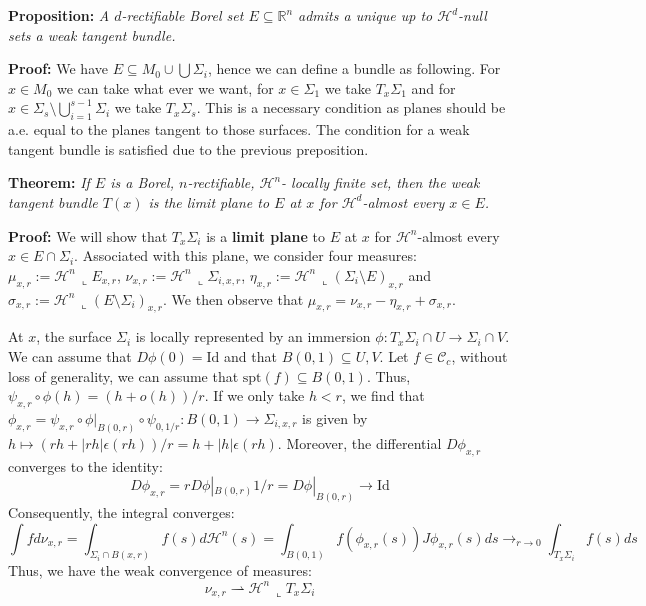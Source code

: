 \documentclass{article}
\begin{document}
\vspace{2ex}
\textbf{Proposition:} \textit{A $d$-rectifiable Borel set $E\subseteq\mathbb R^n$
admits a unique up to $\mathcal H^d$-null sets a weak tangent bundle.}

\vspace{1ex}
\textbf{Proof:} We have $E\subseteq M_0\cup\bigcup\Sigma_i$, hence we can define
a bundle as following. For $x\in M_0$ we can take what ever we want, for $x\in
\Sigma_1$ we take $T_x\Sigma_1$ and for $x\in \Sigma_s\setminus\bigcup_{i=1}^{s
-1}\Sigma_i$ we take $T_x\Sigma_s$. This is a necessary condition as planes
should be a.e. equal to the planes tangent to those surfaces. The condition for
a weak tangent bundle is satisfied due to the previous preposition.

\vspace{2ex}
\textbf{Theorem:} \textit{If $E$ is a Borel, $n$-rectifiable, $\mathcal{H}^n$-
locally finite set, then the weak tangent bundle $T(x)$ is the limit plane to
$E$ at $x$ for $\mathcal{H}^d$-almost every $x\in E$.}

\vspace{1ex}
\textbf{Proof:}
We will show that $T_x\Sigma_i$ is a \textbf{limit plane} to $E$ at $x$ for
$\mathcal H^n$-almost every $x\in E\cap\Sigma_i$. Associated with this plane,
we consider four measures: $\mu_{x,r}:=\mathcal H^n\,\llcorner E_{x,r}$,
$\nu_{x,r}:=\mathcal H^n\,\llcorner\Sigma_{i,x,r}$, $\eta_{x,r}:=\mathcal H^n\,
\llcorner (\Sigma_i\setminus E)_{x,r}$ and $\sigma_{x,r}:=\mathcal H^n\,
\llcorner (E\setminus\Sigma_i)_{x,r}$. We then observe that $\mu_{x,r}=\nu_{x,r}
-\eta_{x,r}+\sigma_{x,r}$.

\vspace{1ex}
At $x$, the surface $\Sigma_i$ is locally represented by an immersion $\phi: T_x\Sigma_i \cap U \rightarrow \Sigma_i \cap V$. We can assume that $D\phi(0)=\text{Id}$ and that $B(0,1)\subseteq U,V$. Let $f\in\mathcal C_c$, without loss of generality, we can assume that $\text{spt}(f)\subseteq B(0,1)$. Thus, $\psi_{x,r}\circ \phi(h)=(h+o(h))/r$. If we only take $h<r$, we find that $\phi_{x,r}=\psi_{x,r}\circ \phi|_{B(0,r)}\circ \psi_{0,1/r}:B(0,1) \rightarrow \Sigma_{i,x,r}$ is given by $h\mapsto (rh+|rh|\epsilon(rh))/r=h+|h|\epsilon(rh)$.
Moreover, the differential $D\phi_{x,r}$ converges to the identity:
\[D\phi_{x,r}=rD\phi|_{B(0,r)}1/r=D\phi|_{B(0,r)}\rightarrow \text{Id}\]
Consequently, the integral converges:
\[\int fd\nu_{x,r}=\int_{\Sigma_i\cap B(x,r)}f(s)d\mathcal H^n(s)=\int_{B(0,1)}f(\phi_{x,r}(s)) J\phi_{x,r}(s)ds\rightarrow_{r\rightarrow 0}\int_{T_x\Sigma_i}f(s)ds\]
Thus, we have the weak convergence of measures:
\[\nu_{x,r}\rightharpoonup\mathcal H^n\,\llcorner T_x\Sigma_i\]
\end{document}
